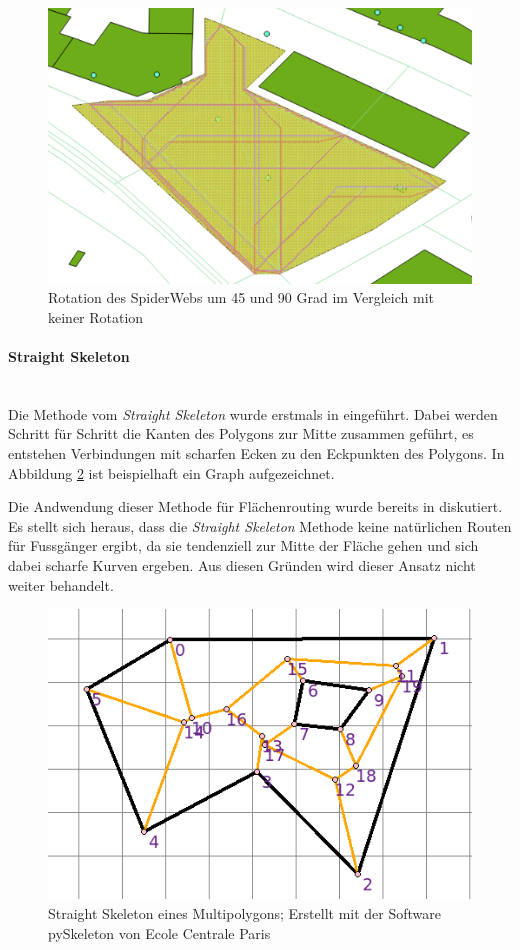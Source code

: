 \begin{figure}[th]
\centering
\includegraphics[width=0.7\linewidth]{technicalreport/img/rotation_comparison}
\caption[SpiderWeb-Graph Vergleich mit Rotation]{Rotation des SpiderWebs um 45 und 90 Grad im Vergleich mit keiner Rotation}
\label{fig:rotation_comparison}
\end{figure}

\paragraph{Straight Skeleton}~\\
Die Methode vom \emph{Straight Skeleton} wurde erstmals in \cite{aichholzer_skeleton} eingeführt. Dabei werden Schritt für Schritt die Kanten des Polygons zur Mitte zusammen geführt, es entstehen Verbindungen mit scharfen Ecken zu den Eckpunkten des Polygons. In Abbildung \ref{fig:skeleton_example} ist beispielhaft ein Graph aufgezeichnet.

Die Andwendung dieser Methode für Flächenrouting wurde bereits in \cite{graser_visibility_graph} diskutiert. Es stellt sich heraus, dass die \emph{Straight Skeleton} Methode keine natürlichen Routen für Fussgänger ergibt, da sie tendenziell zur Mitte der Fläche gehen und sich dabei scharfe Kurven ergeben. Aus diesen Gründen wird dieser Ansatz nicht weiter behandelt.

\begin{figure}[th]
\centering
\includegraphics[width=0.7\linewidth]{technicalreport/img/skeleton_example.png}
\caption[Straight Skeleton Beispiel]{Straight Skeleton eines Multipolygons; Erstellt mit der Software pySkeleton von Ecole Centrale Paris}
\label{fig:skeleton_example}
\end{figure}


